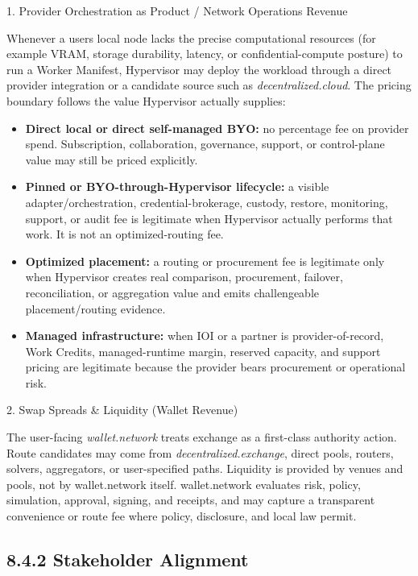 \documentclass[
  11pt,
]{article}
\providecommand{\tightlist}{%
  \setlength{\itemsep}{0pt}\setlength{\parskip}{0pt}}
\begin{document}
1. Provider Orchestration as Product / Network Operations Revenue

Whenever a user\textquotesingle s local node lacks the precise
computational resources (for example VRAM, storage durability, latency,
or confidential-compute posture) to run a Worker Manifest, Hypervisor
may deploy the workload through a direct provider integration or a
candidate source such as \emph{decentralized.cloud}. The pricing boundary
follows the value Hypervisor actually supplies:

\begin{itemize}
\tightlist
\item
  \textbf{Direct local or direct self-managed BYO:} no percentage fee on
  provider spend. Subscription, collaboration, governance, support, or
  control-plane value may still be priced explicitly.
\item
  \textbf{Pinned or BYO-through-Hypervisor lifecycle:} a visible
  adapter/orchestration, credential-brokerage, custody, restore,
  monitoring, support, or audit fee is legitimate when Hypervisor actually
  performs that work. It is not an optimized-routing fee.
\item
  \textbf{Optimized placement:} a routing or procurement fee is
  legitimate only when Hypervisor creates real comparison, procurement,
  failover, reconciliation, or aggregation value and emits challengeable
  placement/routing evidence.
\item
  \textbf{Managed infrastructure:} when IOI or a partner is
  provider-of-record, Work Credits, managed-runtime margin, reserved
  capacity, and support pricing are legitimate because the provider bears
  procurement or operational risk.
\end{itemize}

2. Swap Spreads \& Liquidity (Wallet Revenue)

The user-facing \emph{wallet.network} treats exchange as a first-class
authority action. Route candidates may come from
\emph{decentralized.exchange}, direct pools, routers, solvers,
aggregators, or user-specified paths. Liquidity is provided by venues
and pools, not by wallet.network itself. wallet.network evaluates risk,
policy, simulation, approval, signing, and receipts, and may capture a
transparent convenience or route fee where policy, disclosure, and local
law permit.

\hypertarget{stakeholder-alignment}{%
\subsection{8.4.2 Stakeholder Alignment}\label{stakeholder-alignment}}
\end{document}
